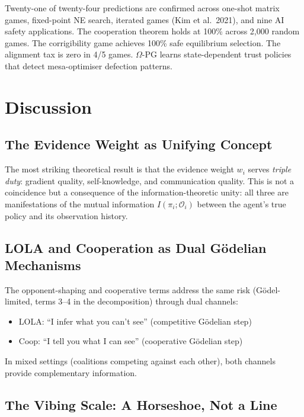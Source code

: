 \documentclass[11pt,a4paper]{article}
\begin{document}
Twenty-one of twenty-four predictions are confirmed across one-shot
matrix games, fixed-point NE search, iterated games (Kim et al.\ 2021),
and nine AI safety applications. The cooperation theorem holds at
100\% across 2,000 random games. The corrigibility game achieves
100\% safe equilibrium selection. The alignment tax is zero in 4/5 games.
$\Omega$-PG learns state-dependent trust policies that detect
mesa-optimiser defection patterns.


\section{Discussion}

\subsection{The Evidence Weight as Unifying Concept}

The most striking theoretical result is that the evidence weight $w_i$
serves \emph{triple duty}: gradient quality, self-knowledge, and
communication quality. This is not a coincidence but a consequence of
the information-theoretic unity: all three are manifestations of the
mutual information $I(\pi_i; \mathcal{O}_i)$ between the agent's
true policy and its observation history.

\subsection{LOLA and Cooperation as Dual G\"odelian Mechanisms}

The opponent-shaping and cooperative terms address the same risk
(G\"odel-limited, terms 3--4 in the decomposition) through dual channels:
\begin{itemize}
    \item LOLA: ``I infer what you can't see'' (competitive G\"odelian step)
    \item Coop: ``I tell you what I can see'' (cooperative G\"odelian step)
\end{itemize}
In mixed settings (coalitions competing against each other), both
channels provide complementary information.

\subsection{The Vibing Scale: A Horseshoe, Not a Line}
\end{document}
